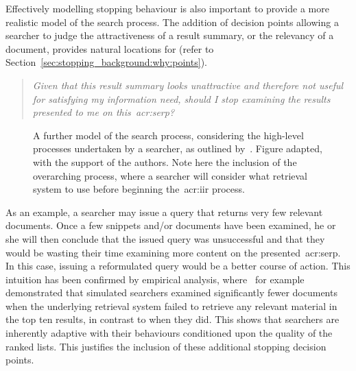 Effectively modelling stopping behaviour is also important to provide a more realistic model of the search process. The addition of decision points allowing a searcher to judge the attractiveness of a result summary, or the relevancy of a document, provides natural locations for  (refer to Section~\ref{sec:stopping_background:why:points}).

\begin{quote}
\emph{Given that this result summary looks unattractive and therefore not useful for satisfying my information need, should I stop examining the results presented to me on this~\gls{acr:serp}?}
\end{quote}

\begin{figure}[t!]
    \centering
    \caption[Model of the search process by~\cite{thomas2014modelling_behaviour}]{A further model of the search process, considering the high-level processes undertaken by a searcher, as outlined by~\cite{thomas2014modelling_behaviour}. Figure adapted, with the support of the authors. Note here the inclusion of the overarching  process, where a searcher will consider what retrieval system to use before beginning the~\gls{acr:iir} process.}
    \label{fig:thomas_model}
\end{figure}

As an example, a searcher may issue a query that returns very few relevant documents. Once a few snippets and/or documents have been examined, he or she will then conclude that the issued query was unsuccessful and that they would be wasting their time examining more content on the presented~\gls{acr:serp}. In this case, issuing a reformulated query would be a better course of action. This intuition has been confirmed by empirical analysis, where~\cite{azzopardi2011economics} for example demonstrated that simulated searchers examined significantly fewer documents when the underlying retrieval system failed to retrieve any relevant material in the top ten results, in contrast to when they did. This shows that searchers are inherently adaptive with their behaviours conditioned upon the quality of the ranked lists. This justifies the inclusion of these additional stopping decision points.

